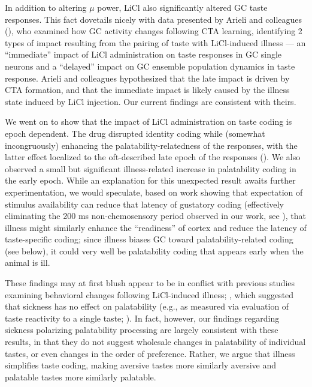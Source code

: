 \begin{refsection}
In addition to altering \(\mu\) power, LiCl also significantly altered GC taste responses. This fact dovetails nicely with data presented by Arieli and colleagues (\cite{arieli2022a}), who examined how GC activity changes following CTA learning, identifying 2 types of impact resulting from the pairing of taste with LiCl-induced illness --- an “immediate” impact of LiCl administration on taste responses in GC single neurons and a “delayed” impact on GC ensemble population dynamics in taste response. Arieli and colleagues hypothesized that the late impact is driven by CTA formation, and that the immediate impact is likely caused by the illness state induced by LiCl injection. Our current findings are consistent with theirs.

We went on to show that the impact of LiCl administration on taste coding is epoch dependent. The drug disrupted identity coding while (somewhat incongruously) enhancing the palatability-relatedness of the responses, with the latter effect localized to the oft-described late epoch of the responses (\cite{katz-a,katz2001a,sadacca2016a}). We also observed a small but significant illness-related increase in palatability coding in the early epoch. While an explanation for this unexpected result awaits further experimentation, we would speculate, based on work showing that expectation of stimulus availability can reduce that latency of gustatory coding (effectively eliminating the 200 ms non-chemosensory period observed in our work, see \cite{samuelsen2012a,gutierrez2010a,stapleton2006a,graham2014a,bouaichi2020a,dikecligil2020a}), that illness might similarly enhance the “readiness” of cortex and reduce the latency of taste-specific coding; since illness biases GC toward palatability-related coding (see below), it could very well be palatability coding that appears early when the animal is ill.

These findings may at first blush appear to be in conflict with previous studies examining behavioral changes following LiCl-induced illness; \cite{spector1988a,baird2005a,eckel1996a}, which suggested that sickness has no effect on palatability (e.g., as measured via evaluation of taste reactivity to a single taste; \cite{spector1988a}). In fact, however, our findings regarding sickness polarizing palatability processing are largely consistent with these results, in that they do not suggest wholesale changes in palatability of individual tastes, or even changes in the order of preference. Rather, we argue that illness simplifies taste coding, making aversive tastes more similarly aversive and palatable tastes more similarly palatable.


\end{refsection}

